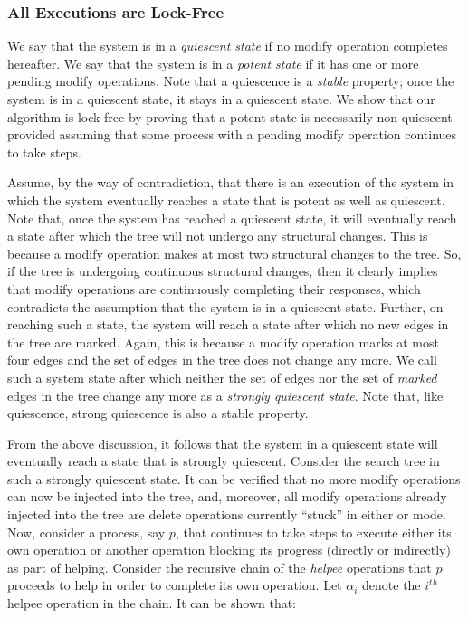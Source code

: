 \subsubsection{All Executions are Lock-Free}
	
	
We say that the system is in a \emph{quiescent state} if no modify operation 
completes hereafter. We say that the system is in a \emph{potent state} if it 
has one or more pending modify operations. Note that a quiescence is a \emph{
stable} property; once the system is in a quiescent state, it stays in a 
quiescent state. We show that our algorithm is lock-free by proving that 
a potent state is necessarily non-quiescent provided assuming that some 
process with a pending modify operation continues to take steps. 

Assume, by the way of contradiction, that there is an execution of the system 
in which the system eventually reaches a state that is potent as well as 
quiescent. Note that, once the system has reached a quiescent state, it will 
eventually reach a state after which the tree will not undergo any structural 
changes. This is because a modify operation makes at most two structural changes to the 
tree. So, if the tree is undergoing continuous structural changes, then it 
clearly implies that modify operations are continuously completing their 
responses, which contradicts the assumption that the system is in a quiescent 
state. Further, on reaching such a state, the system will reach a state after 
which no new edges in the tree are marked. Again, this is because a modify 
operation marks at most four edges and the set of edges in the tree does not 
change any more. We call such a system state after  which neither
the set of edges nor the set of \emph{marked} edges in the tree change any 
more as a \emph{strongly quiescent state}. Note that, like quiescence, strong 
quiescence is also a stable property. 

From the above discussion, it follows that the system in a quiescent state will eventually reach a state that is strongly quiescent. Consider the search tree in such a strongly quiescent state. It can be verified that no more modify operations can now be injected into the tree, and, moreover,  
all modify operations already injected into the tree are delete operations currently ``stuck'' in either \discovery{} or \cleanup{} mode. 
Now, consider a process, say $p$, that continues to take steps to execute either its own operation or another operation blocking its progress (directly or indirectly) as part of helping. 
Consider the recursive chain of the \emph{helpee} operations that $p$ proceeds to help in order to complete its own operation. Let $\alpha_i$ denote the $i^{th}$ helpee operation in the chain.
It can be shown that:

